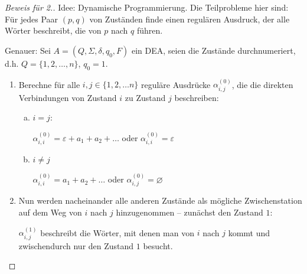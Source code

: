 \documentclass[11pt]{article} %
\theoremstyle{definition}
\begin{document}
\begin{proof}[Beweis für 2.]

Idee: Dynamische Programmierung. Die Teilprobleme hier sind: Für jedes Paar $(p,q)$ von Zuständen finde einen regulären Ausdruck, der alle Wörter beschreibt, die von $p$ nach $q$ führen.

Genauer: Sei $A = (Q, \Sigma, \delta, q_0, F)$ ein DEA, seien die Zustände durchnumeriert, d.h. $Q = \{1,2,\dots , n \}$, $q_0 = 1$.

\begin{enumerate}
\item Berechne für alle $i, j \in \{1,2,\dots n\}$ reguläre Ausdrücke $\alpha_{i,j}^{(0)}$, die die direkten Verbindungen von Zustand $i$ zu Zustand $j$ beschreiben:
\begin{enumerate}[a)]
\item $i = j$:
\begin{center}
\end{center}

$\alpha_{i,i}^{(0)} = \varepsilon + a_1 + a_2 + \dots$ oder $\alpha_{i,i}^{(0)} = \varepsilon$

\item $i \neq j$

$\alpha_{i,i}^{(0)} = a_1 + a_2 + \dots$ oder $\alpha_{i,j}^{(0)} = \varnothing$
\end{enumerate}

\item Nun werden nacheinander alle anderen Zustände als mögliche Zwischenstation auf dem Weg von $i$ nach $j$ hinzugenommen -- zunächst den Zustand $1$:

$\alpha_{i,j}^{(1)}$ beschreibt die Wörter, mit denen man von $i$ nach $j$ kommt und zwischendurch nur den Zustand $1$ besucht.
\end{enumerate}


\end{proof}
\end{document}
